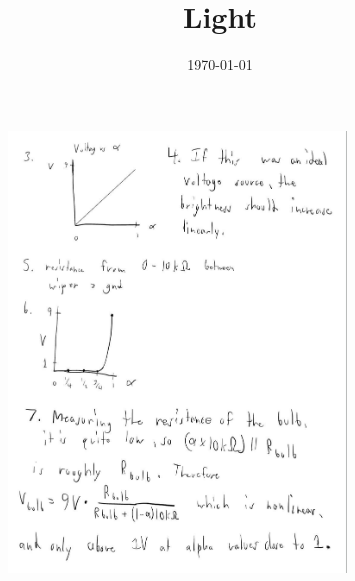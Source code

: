 \documentclass{article}
\begin{document}
\title{Light}
\author{}
\date{\today}

\maketitle

\begin{figure}[H]
    \centering
    \includegraphics[width=0.8\textwidth]{image.jpg}
\end{figure}
\end{document}

